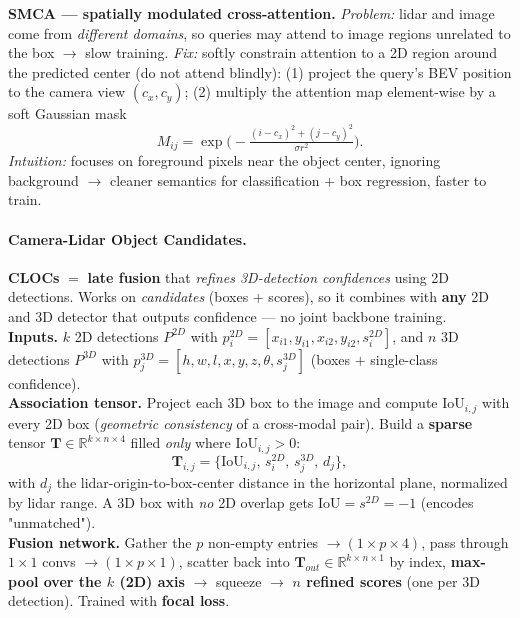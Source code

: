 \documentclass{article}
\begin{document}
\textbf{SMCA --- spatially modulated cross-attention.} \textit{Problem:} lidar and image come from \textit{different domains}, so queries may attend to image regions unrelated to the box $\rightarrow$ slow training. \textit{Fix:} softly constrain attention to a 2D region around the predicted center (do not attend blindly): (1) project the query's BEV position to the camera view $(c_x,c_y)$; (2) multiply the attention map element-wise by a soft Gaussian mask
\begin{equation*}
M_{ij}=\exp\!\Big(-\tfrac{(i-c_x)^2+(j-c_y)^2}{\sigma r^2}\Big).
\end{equation*}
\textit{Intuition:} focuses on foreground pixels near the object center, ignoring background $\rightarrow$ cleaner semantics for classification + box regression, faster to train.

\paragraph{Camera-Lidar Object Candidates.}
\textbf{CLOCs} $=$ \textbf{late fusion} that \textit{refines 3D-detection confidences} using 2D detections. Works on \textit{candidates} (boxes + scores), so it combines with \textbf{any} 2D and 3D detector that outputs confidence --- no joint backbone training.\\

\textbf{Inputs.} $k$ 2D detections $P^{2D}$ with $p_i^{2D}=[x_{i1},y_{i1},x_{i2},y_{i2},s_i^{2D}]$, and $n$ 3D detections $P^{3D}$ with $p_j^{3D}=[h,w,l,x,y,z,\theta,s_j^{3D}]$ (boxes $+$ single-class confidence).\\

\textbf{Association tensor.} Project each 3D box to the image and compute $\mathrm{IoU}_{i,j}$ with every 2D box (\textit{geometric consistency} of a cross-modal pair). Build a \textbf{sparse} tensor $\mathbf T\in\mathbb{R}^{k\times n\times 4}$ filled \textit{only} where $\mathrm{IoU}_{i,j}>0$:
\begin{equation*}
\mathbf T_{i,j}=\{\mathrm{IoU}_{i,j},\,s_i^{2D},\,s_j^{3D},\,d_j\},
\end{equation*}
with $d_j$ the lidar-origin-to-box-center distance in the horizontal plane, normalized by lidar range. A 3D box with \textit{no} 2D overlap gets $\mathrm{IoU}=s^{2D}=-1$ (encodes "unmatched").\\

\textbf{Fusion network.} Gather the $p$ non-empty entries $\rightarrow (1\times p\times 4)$, pass through $1\times1$ convs $\rightarrow (1\times p\times 1)$, scatter back into $\mathbf T_{out}\in\mathbb{R}^{k\times n\times 1}$ by index, \textbf{max-pool over the $k$ (2D) axis} $\rightarrow$ squeeze $\rightarrow$ \textbf{$n$ refined scores} (one per 3D detection). Trained with \textbf{focal loss}.\\
\end{document}
